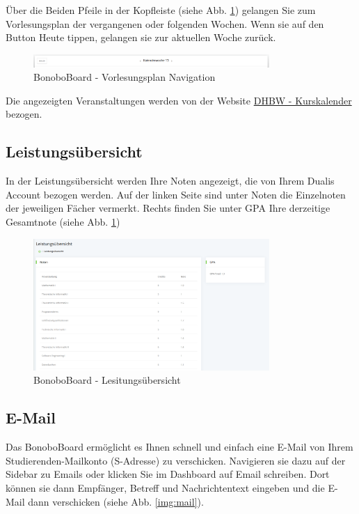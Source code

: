 \documentclass[a4paper,11pt]{scrartcl}
\begin{document}
Über die Beiden Pfeile in der Kopfleiste (siehe Abb. \ref{img:lecture_nav}) gelangen Sie zum Vorlesungsplan der vergangenen oder folgenden Wochen. Wenn sie auf den Button \frqq{}Heute\flqq{} tippen, gelangen sie zur aktuellen Woche zurück.

\begin{figure}[H]
	\begin{center}
		\includegraphics[width=0.8\textwidth]{lecture_nav}
		\caption{BonoboBoard - Vorlesungsplan Navigation}
		\label{img:lecture_nav}
	\end{center}
\end{figure}
\noindent

Die angezeigten Veranstaltungen werden von der Website \frqq{}\href{https://vorlesungsplan.dhbw-mannheim.de/index.php}{DHBW - Kurskalender}\flqq{} bezogen.


\subsection{Leistungsübersicht}
In der Leistungsübersicht werden Ihre Noten angezeigt, die von Ihrem Dualis Account bezogen werden. Auf der linken Seite sind unter \frqq{}Noten\flqq{} die Einzelnoten der jeweiligen Fächer vermerkt. Rechts finden Sie unter \frqq{}GPA\flqq{} Ihre derzeitige Gesamtnote (siehe Abb. \ref{img:lecture_nav})

\begin{figure}[H]
	\begin{center}
		\includegraphics[width=0.8\textwidth]{dualis}
		\caption{BonoboBoard - Lesitungsübersicht}
		\label{img:dualis}
	\end{center}
\end{figure}
\noindent

\subsection{E-Mail}
\label{sec:email}
Das BonoboBoard ermöglicht es Ihnen schnell und einfach eine E-Mail von Ihrem Studierenden-Mailkonto (\frqq{}S-Adresse\flqq{}) zu verschicken. Navigieren sie dazu auf der Sidebar zu \frqq{}Emails\flqq{} oder klicken Sie im Dashboard auf \frqq{}Email schreiben\flqq{}. Dort können sie dann Empfänger, Betreff und Nachrichtentext eingeben und die E-Mail dann verschicken (siehe Abb. \ref{img:mail}).
 
\end{document}
